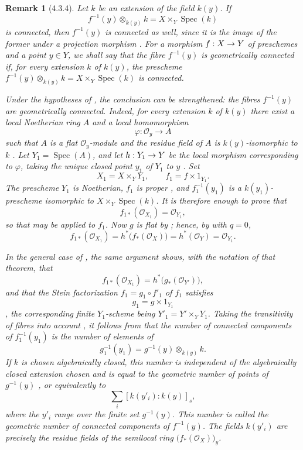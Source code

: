 \documentclass[oneside]{amsart}
\theoremstyle{ega-env-style}
\theoremstyle{ega-thm-env-style}
\theoremstyle{ega-defn-env-style}
\newtheorem*{remark}{Remark}
\def\mathcal{\mathscr}
\def\sh{\mathcal}                   %
\def\kres{k}                        %
\def\Spec{\operatorname{Spec}}
\renewcommand{\to}{\mathchoice{\longrightarrow}{\rightarrow}{\rightarrow}{\rightarrow}}
\newcommand{\oldpage}[2][]{{\marginnote{\normalfont{\textbf{#1}~|~#2}}}\ignorespaces}
\let\EGAOriginalLabel\label
\renewcommand{\label}[1]{\phantomsection\EGAOriginalLabel{#1}}
\begin{document}
\begin{remark}[4.3.4]
\label{III.4.3.4}
Let $k$ be an extension of the field $\kres(y)$.  If
\[
  f^{-1}(y)\otimes_{\kres(y)}k
  =
  X\times_Y\Spec(k)
\]
is connected, then $f^{-1}(y)$ is connected as well, since it is the
image of the former under a projection morphism
.  For a morphism $f:X\to Y$ of preschemes and a
point $y\in Y$, we shall say that the fibre $f^{-1}(y)$ is
\emph{geometrically connected} if, for every extension $k$ of
$\kres(y)$, the prescheme
$f^{-1}(y)\otimes_{\kres(y)}k=X\times_Y\Spec(k)$ is connected.

\oldpage[III]{132}

Under the hypotheses of , the conclusion can be
strengthened: the fibres $f^{-1}(y)$ are geometrically connected.
Indeed, for every extension $k$ of $\kres(y)$ there exist a local
Noetherian ring $A$ and a local homomorphism
\[
  \varphi:\sh{O}_y\longrightarrow A
\]
such that $A$ is a flat $\sh{O}_y$-module and the residue field of
$A$ is $\kres(y)$-isomorphic to $k$ .
Let $Y_1=\Spec(A)$, and let $h:Y_1\to Y$ be the local morphism
corresponding to $\varphi$, taking the unique closed point $y_1$ of
$Y_1$ to $y$ .  Set
\[
  X_1=X\times_Y Y_1,
  \qquad
  f_1=f\times 1_{Y_1}.
\]
The prescheme $Y_1$ is Noetherian, $f_1$ is proper
, and $f_1^{-1}(y_1)$ is a
$\kres(y_1)$-prescheme isomorphic to $X\times_Y\Spec(k)$.  It is
therefore enough to prove that
\[
  f_{1*}(\sh{O}_{X_1})=\sh{O}_{Y_1},
\]
so that  may be applied to $f_1$.  Now $g$ is flat
by ; hence, by  with $q=0$,
\[
  f_{1*}(\sh{O}_{X_1})
  =
  h^*\bigl(f_*(\sh{O}_X)\bigr)
  =
  h^*(\sh{O}_Y)
  =
  \sh{O}_{Y_1}.
\]

In the general case of , the same argument shows,
with the notation of that theorem, that
\[
  f_{1*}(\sh{O}_{X_1})
  =
  h^*\bigl(g_*(\sh{O}_{Y'})\bigr),
\]
and that the Stein factorization $f_1=g_1\circ f'_1$ of $f_1$
satisfies
\[
  g_1=g\times 1_{Y_1}
\]
, the corresponding finite $Y_1$-scheme being
$Y'_1=Y'\times_Y Y_1$.  Taking the transitivity of fibres into
account , it follows from
 that the number of connected components of
$f_1^{-1}(y_1)$ is the number of elements of
\[
  g_1^{-1}(y_1)
  =
  g^{-1}(y)\otimes_{\kres(y)}k.
\]
If $k$ is chosen algebraically closed, this number is independent of
the algebraically closed extension chosen and is equal to the
\emph{geometric number of points} of $g^{-1}(y)$
, or equivalently to
\[
  \sum_i[\kres(y'_i):\kres(y)]_s,
\]
where the $y'_i$ range over the finite set $g^{-1}(y)$.  This number
is called the \emph{geometric number of connected components} of
$f^{-1}(y)$.  The fields $\kres(y'_i)$ are precisely the residue
fields of the semilocal ring $\bigl(f_*(\sh{O}_X)\bigr)_y$.
\end{remark}
\end{document}

